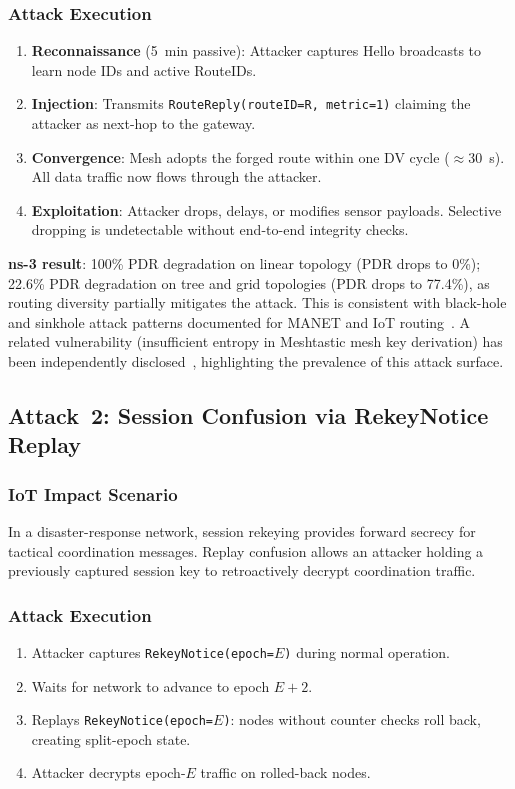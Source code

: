 \documentclass[10pt,journal,compsoc]{IEEEtran}
\begin{document}
\subsubsection{Attack Execution}
\begin{enumerate}
  \item \textbf{Reconnaissance} (5~min passive): Attacker captures
    Hello broadcasts to learn node IDs and active RouteIDs.
  \item \textbf{Injection}: Transmits
    \texttt{RouteReply(routeID=R, metric=1)} claiming the attacker
    as next-hop to the gateway.
  \item \textbf{Convergence}: Mesh adopts the forged route within
    one DV cycle ($\approx$30~s). All data traffic now flows
    through the attacker.
  \item \textbf{Exploitation}: Attacker drops, delays, or modifies
    sensor payloads. Selective dropping is undetectable without
    end-to-end integrity checks.
\end{enumerate}

\textbf{ns-3 result}: 100\% PDR degradation on linear topology (PDR drops to 0\%);
22.6\% PDR degradation on tree and grid topologies (PDR drops to 77.4\%),
as routing diversity partially mitigates the attack.
This is consistent with black-hole and sinkhole attack patterns
documented for MANET and IoT routing~\cite{sejaphala2025-sinkhole-detection,ieee2025-blackhole-optimization,zenodo2025-manet-routing-attacks}.
A related vulnerability (insufficient entropy in Meshtastic mesh
key derivation) has been independently disclosed~\cite{cve2025-meshtastic-entropy},
highlighting the prevalence of this attack surface.

\subsection{Attack~2: Session Confusion via RekeyNotice Replay}

\subsubsection{IoT Impact Scenario}
In a disaster-response network, session rekeying provides forward
secrecy for tactical coordination messages. Replay confusion
allows an attacker holding a previously captured session key to
retroactively decrypt coordination traffic.

\subsubsection{Attack Execution}
\begin{enumerate}
  \item Attacker captures \texttt{RekeyNotice(epoch=$E$)} during
    normal operation.
  \item Waits for network to advance to epoch $E{+}2$.
  \item Replays \texttt{RekeyNotice(epoch=$E$)}: nodes without
    counter checks roll back, creating split-epoch state.
  \item Attacker decrypts epoch-$E$ traffic on rolled-back nodes.
\end{enumerate}
\end{document}
